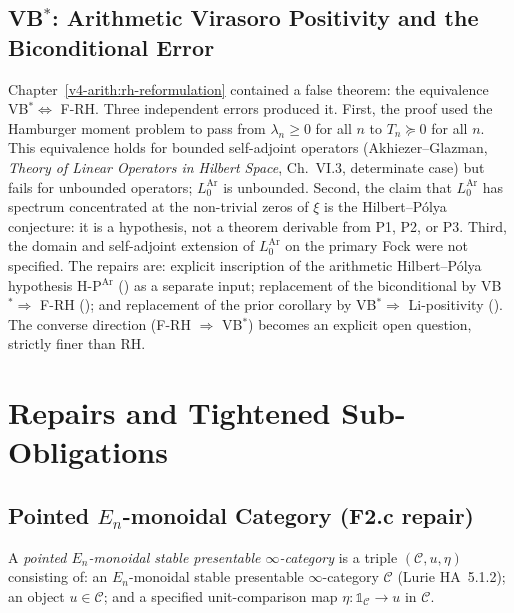 \subsection{\texorpdfstring{VB\(^{*}\)}{VB*}: Arithmetic Virasoro Positivity and the Biconditional Error}

Chapter~\ref{v4-arith:rh-reformulation} contained a false theorem:
the equivalence VB\(^{*}\Leftrightarrow\) F-RH.
Three independent errors produced it.
First, the proof used the Hamburger moment problem to pass from
\(\lambda_{n}\geq 0\) for all \(n\) to \(T_{n}\succeq 0\) for all \(n\).
This equivalence holds for bounded self-adjoint operators
(Akhiezer--Glazman, \emph{Theory of Linear Operators in Hilbert Space},
Ch.~VI.3, determinate case) but fails for unbounded operators;
\(L_{0}^{\mathrm{Ar}}\) is unbounded.
Second, the claim that \(L_{0}^{\mathrm{Ar}}\) has spectrum concentrated
at the non-trivial zeros of \(\xi\) is the Hilbert--P\'olya conjecture:
it is a hypothesis, not a theorem derivable from P1, P2, or P3.
Third, the domain and self-adjoint extension of \(L_{0}^{\mathrm{Ar}}\)
on the primary Fock were not specified.
The repairs are: explicit inscription of the arithmetic Hilbert--P\'olya
hypothesis H-P\(^{\mathrm{Ar}}\) () as a
separate input; replacement of the biconditional by
VB\(^{*}\Rightarrow\) F-RH
(); and replacement of the
prior corollary by VB\(^{*}\Rightarrow\) Li-positivity
().
The converse direction (F-RH \(\Rightarrow\) VB\(^{*}\)) becomes an
explicit open question, strictly finer than RH.

\section{Repairs and Tightened Sub-Obligations}
\label{v4-arith:sw:heals}

\subsection{Pointed \(E_{n}\)-monoidal Category (F2.c repair)}

\begin{definition}
\label{v4-arith:sw:def:pointed-En}
A \emph{pointed \(E_{n}\)-monoidal stable presentable \(\infty\)-category}
is a triple \((\mathcal{C},u,\eta)\) consisting of: an \(E_{n}\)-monoidal
stable presentable \(\infty\)-category \(\mathcal{C}\) (Lurie
HA~5.1.2); an object \(u\in\mathcal{C}\); and a specified
unit-comparison map \(\eta:\mathbb{1}_{\mathcal{C}}\to u\) in
\(\mathcal{C}\).
\end{definition}

